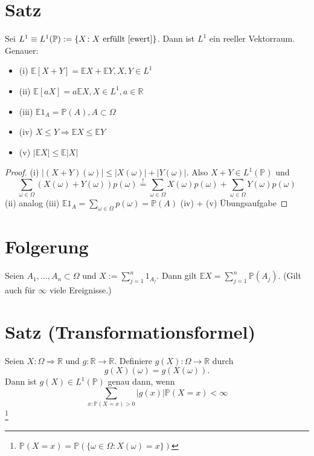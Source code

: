 \documentclass[a4paper,11pt,notitlepage]{report}
\newcommand{\R}{{\ensuremath{\mathbb{R}}}}
\newcommand{\Prim}{{\ensuremath{\mathbb{P}}}}
\newcommand{\E}{{\ensuremath{\mathbb{E}}}}
\begin{document}
\section{Satz}
Sei $L^1 \equiv L^1(\Prim) := \{X \colon X \text{ erfüllt } \ref{ewert} \}$. Dann ist $L^1$ ein reeller Vektorraum. Genauer:
\begin{itemize}
	\item (i) $\E [X+Y] = \E X + \E Y, X,Y \in L^1$
	\item (ii) $\E [aX] = a \E X, X \in L^1, a \in \R$
	\item (iii) $\E 1_A = \Prim(A), A \subset \Omega$
	\item (iv) $X \leq Y \Rightarrow \E X \leq \E Y$
	\item (v) $|\E X| \leq \E |X|$
\end{itemize}

\begin{proof}
	(i) $|(X+Y)(\omega)| \leq |X(\omega)| + |Y(\omega)|$.
	\newline
	Also $X+Y \in L^1(\Prim)$ und
	$$\sum\limits_{\omega \in \Omega}{(X(\omega)+Y(\omega)) p(\omega)} \overset{!}{=} \sum\limits_{\omega \in \Omega}{X(\omega)p(\omega)} + \sum\limits_{\omega \in \Omega}{Y(\omega)p(\omega)}$$
	(ii) analog
	\newline
	(iii) $\E 1_A = \sum\limits_{\omega \in \Omega}{p(\omega)}=\Prim(A)$
	\newline
	(iv) + (v) Übungsaufgabe
\end{proof}

\section{Folgerung}
\label{folg}
Seien $A_1, \ldots, A_n \subset \Omega$ und $X := \sum\limits_{j=1}^{n}{1_{A_j}}$. Dann gilt $\E X = \sum\limits_{j=1}^{n}{\Prim(A_j)}$. \newline
(Gilt auch für $\infty$ viele Ereignisse.)

\section{Satz (Transformationsformel)}
\label{5.4}
Seien $X \colon \Omega \Rightarrow \R$ und $g \colon \R \rightarrow \R$. Definiere $g(X) \colon \Omega \rightarrow \R$ durch $$g(X)(\omega) = g(X(\omega)).$$ Dann ist $g(X) \in L^1(\Prim)$ genau dann, wenn
$$\sum\limits_{x \colon \Prim(X=x)>0}{|g(x)| \Prim(X=x)} < \infty$$\footnote{$\Prim(X=x) = \Prim(\{\omega \in \Omega \colon X(\omega)=x\})$}
\end{document}
